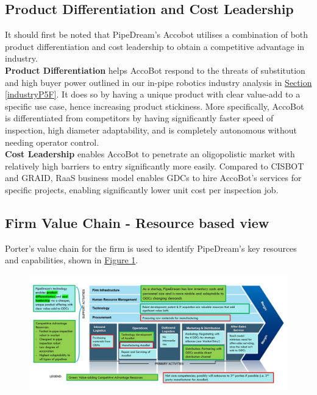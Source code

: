 \documentclass[11pt]{article}		%
\newcommand{\figref}[1]{\hyperref[#1]{Figure \ref*{#1}}}    %
\newcommand{\sectref}[1]{\hyperref[#1]{Section \ref*{#1}}}     %
\begin{document}
	\subsection{Product Differentiation and Cost Leadership}
	It should first be noted that PipeDream's Accobot utilises a combination of both product differentiation and cost leadership to obtain a competitive advantage in industry.
	\\ 
	\hspace*{3ex} \textbf{Product Differentiation} helps AccoBot respond to the threats of substitution and high buyer power outlined in our in-pipe robotics industry analysis in \sectref{industryP5F}. It does so by having a unique product with clear value-add to a specific use case, hence increasing product stickiness. More specifically, AccoBot is differentiated from competitors by having significantly faster speed of inspection, high diameter adaptability, and is completely autonomous without needing operator control.
	\\ \hspace*{3ex} \textbf{Cost Leadership} enables AccoBot to penetrate an oligopolistic market with relatively high barriers to entry significantly more easily. Compared to CISBOT and GRAID, RaaS business model enables GDCs to hire AccoBot's services for specific projects, enabling significantly lower unit cost per inspection job. 
	
	\subsection[Firm Value Chain]{Firm Value Chain - Resource based view}
 Porter's value chain for the firm is used to identify PipeDream's key resources and capabilities, shown in \figref{valueChain}. 
 
                \begin{figure}[H]
    					\centering
        					\includegraphics[width=\textwidth]{valuechain.jpg}
        					\label{valueChain}
			    \end{figure}
 
\end{document}
